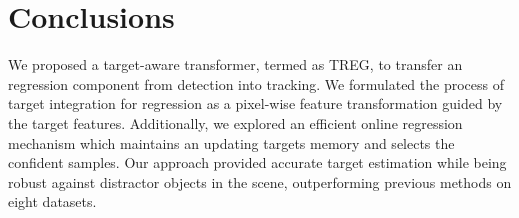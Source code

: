 \documentclass[10pt,twocolumn,letterpaper]{article}
\begin{document}
\section{Conclusions}
We proposed a target-aware transformer, termed as TREG, to transfer an regression component from detection into tracking. 
We formulated the process of target integration for regression as a pixel-wise feature transformation guided by the target features. 
Additionally, we explored an efficient online regression mechanism which maintains an updating targets memory and selects the confident samples.
Our approach provided accurate target estimation while being robust against distractor objects in the scene, outperforming previous methods on eight datasets.

{\small


}
\end{document}
